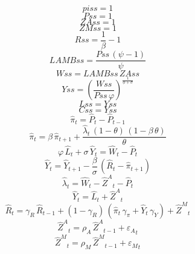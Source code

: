 \begin{dmath*}
piss = 1
\end{dmath*}
\begin{dmath*}
Pss = 1
\end{dmath*}
\begin{dmath*}
ZAss = 1
\end{dmath*}
\begin{dmath*}
ZMss = 1
\end{dmath*}
\begin{dmath*}
Rss = \frac{1}{{{\beta}}}-1
\end{dmath*}
\begin{dmath*}
LAMBss = \frac{{Pss}\, \left({{\psi}}-1\right)}{{{\psi}}}
\end{dmath*}
\begin{dmath*}
Wss = {LAMBss}\, {ZAss}
\end{dmath*}
\begin{dmath*}
Yss = \left(\frac{{Wss}}{{Pss}\, {{\varphi}}}\right)^{\frac{1}{{{\phi}}+{{\sigma}}}}
\end{dmath*}
\begin{dmath*}
Lss = {Yss}
\end{dmath*}
\begin{dmath*}
Css = {Yss}
\end{dmath*}
\begin{dmath}
{{\hat{\pi}}}_{t}={{\hat{P}}}_{t}-{{\hat{P}}}_{t-1}
\end{dmath}
\begin{dmath}
{{\hat{\pi}}}_{t}={{\beta}}\, {{\hat{\pi}}}_{t+1}+\frac{{{\hat{\lambda}}}_{t}\, \left(1-{{\theta}}\right)\, \left(1-{{\beta}}\, {{\theta}}\right)}{{{\theta}}}
\end{dmath}
\begin{dmath}
{{\varphi}}\, {{\hat{L}}}_{t}+{{\sigma}}\, {{\hat{Y}}}_{t}={{\hat{W}}}_{t}-{{\hat{P}}}_{t}
\end{dmath}
\begin{dmath}
{{\hat{Y}}}_{t}={{\hat{Y}}}_{t+1}-\frac{{{\beta}}}{{{\sigma}}}\, \left({{\hat{R}}}_{t}-{{\hat{\pi}}}_{t+1}\right)
\end{dmath}
\begin{dmath}
{{\hat{\lambda}}}_{t}={{\hat{W}}}_{t}-{{\hat{Z}^A}}_{t}-{{\hat{P}}}_{t}
\end{dmath}
\begin{dmath}
{{\hat{Y}}}_{t}={{\hat{L}}}_{t}+{{\hat{Z}^A}}_{t}
\end{dmath}
\begin{dmath}
{{\hat{R}}}_{t}={{\gamma_R}}\, {{\hat{R}}}_{t-1}+\left(1-{{\gamma_R}}\right)\, \left({{\hat{\pi}}}_{t}\, {{\gamma_\pi}}+{{\hat{Y}}}_{t}\, {{\gamma_Y}}\right)+{{\hat{Z}^M}}_{t}
\end{dmath}
\begin{dmath}
{{\hat{Z}^A}}_{t}={{\rho_A}}\, {{\hat{Z}^A}}_{t-1}+{{\varepsilon_A}}_{t}
\end{dmath}
\begin{dmath}
{{\hat{Z}^M}}_{t}={{\rho_M}}\, {{\hat{Z}^M}}_{t-1}+{{\varepsilon_M}}_{t}
\end{dmath}
